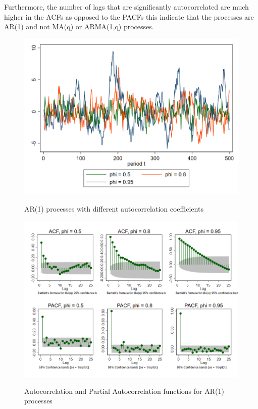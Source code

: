 Furthermore, the number of lags that are significantly autocorrelated are much higher in the ACFs as opposed to the PACFs this indicate that the processes are AR(1) and not MA(q) or ARMA(1,q) processes.
\begin{figure}[H]
  \caption{AR(1) processes with different autocorrelation coefficients}
  \includegraphics[width= \textwidth]{03_figures/fig22b}
  \label{fig:ar1}
  \vspace{-1cm}
\end{figure}
\begin{figure}[H]
  \caption{Autocorrelation and Partial Autocorrelation functions for AR(1) processes}
  \includegraphics[width= \textwidth]{03_figures/fig22b_ac}
  \label{fig:ar1_acf}
  \vspace{-1cm}
\end{figure}
